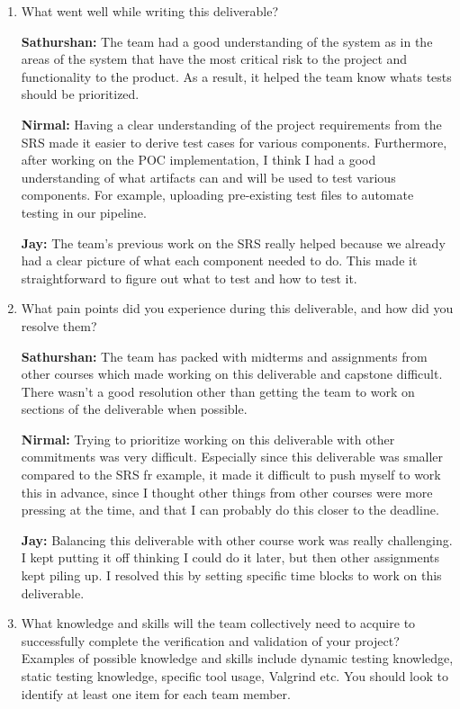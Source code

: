 \documentclass[12pt, titlepage]{article}
\begin{document}
\begin{enumerate}
  \item What went well while writing this deliverable?

  \textbf{Sathurshan:} The team had a good understanding of the system as in
  the areas of the system that have the most critical risk to the project and
  functionality to the product. As a result, it helped the team know whats tests
  should be prioritized.

  \textbf{Nirmal:} Having a clear understanding of the project requirements 
  from the SRS made it easier to derive test cases for various components. 
  Furthermore, after working on the POC implementation, I think I had a good 
  understanding of what artifacts can and will be used to test various 
  components. For example, uploading pre-existing test files to automate 
  testing in our pipeline.

  \textbf{Jay:} The team's previous work on the SRS really helped because we already 
  had a clear picture of what each component needed to do. 
  This made it straightforward to figure out what to test and how to test it.

  \item What pain points did you experience during this deliverable, and how
    did you resolve them?

  \textbf{Sathurshan:} The team has packed with midterms and assignments from
  other courses which made working on this deliverable and capstone difficult.
  There wasn't a good resolution other than getting the team to work on sections
  of the deliverable when possible.

  \textbf{Nirmal:} Trying to prioritize working on this deliverable with other 
  commitments was very difficult. Especially since this deliverable was smaller 
  compared to the SRS fr example, it made it difficult to push myself to work 
  this in advance, since I thought other things from other courses were more 
  pressing at the time, and that I can probably do this closer to the deadline.

  \textbf{Jay:} Balancing this deliverable with other course work was really challenging. 
  I kept putting it off thinking I could do it later, but then other assignments kept piling up. 
  I resolved this by setting specific time blocks to work on this deliverable.

  \item What knowledge and skills will the team collectively need to acquire to
  successfully complete the verification and validation of your project?
  Examples of possible knowledge and skills include dynamic testing knowledge,
  static testing knowledge, specific tool usage, Valgrind etc.  You should look
  to identify at least one item for each team member.
  

\end{enumerate}
\end{document}
